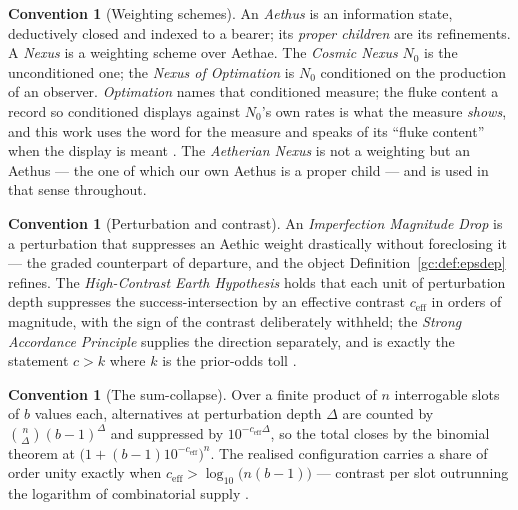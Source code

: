 \documentclass[11pt]{article}
\numberwithin{equation}{section}
\theoremstyle{plain}
\theoremstyle{definition}
\newtheorem{convention}[theorem]{Convention}
\theoremstyle{remark}
\begin{document}
\begin{convention}[Weighting schemes]\label{gc:conv:weightings}
An \emph{Aethus} is an information state, deductively closed and indexed
to a bearer; its \emph{proper children} are its refinements. A
\emph{Nexus} is a weighting scheme over Aethae. The \emph{Cosmic Nexus}
$N_0$ is the unconditioned one; the \emph{Nexus of Optimation} is $N_0$
conditioned on the production of an observer. \emph{Optimation} names
that conditioned measure; the fluke content a record so conditioned
displays against $N_0$'s own rates is what the measure \emph{shows},
and this work uses the word for the measure and speaks of its
``fluke content'' when the display is meant \cite{Aethus, Nexus,
Ben26Found}. The \emph{Aetherian Nexus} is not a weighting but an
Aethus --- the one of which our own Aethus is a proper child --- and is
used in that sense throughout.
\end{convention}

\begin{convention}[Perturbation and contrast]\label{gc:conv:imd}
An \emph{Imperfection Magnitude Drop} is a perturbation that suppresses
an Aethic weight drastically without foreclosing it --- the graded
counterpart of departure, and the object
Definition~\ref{gc:def:epsdep} refines. The \emph{High-Contrast Earth
Hypothesis} holds that each unit of perturbation depth suppresses the
success-intersection by an effective contrast $c_{\mathrm{eff}}$ in
orders of magnitude, with the sign of the contrast deliberately withheld;
the \emph{Strong Accordance Principle} supplies the direction separately,
and is exactly the statement $c>k$ where $k$ is the prior-odds toll
\cite{Ben26Optimal}.
\end{convention}

\begin{convention}[The sum-collapse]\label{gc:conv:collapse}
Over a finite product of $n$ interrogable slots of $b$ values each,
alternatives at perturbation depth $\Delta$ are counted by
$\binom{n}{\Delta}(b-1)^{\Delta}$ and suppressed by
$10^{-c_{\mathrm{eff}}\Delta}$, so the total closes by the binomial
theorem at $\bigl(1+(b-1)10^{-c_{\mathrm{eff}}}\bigr)^{n}$. The realised
configuration carries a share of order unity exactly when
$c_{\mathrm{eff}}>\log_{10}\bigl(n(b-1)\bigr)$ --- contrast per slot
outrunning the logarithm of combinatorial supply \cite{Ben26Optimal}.
\end{convention}
\end{document}

